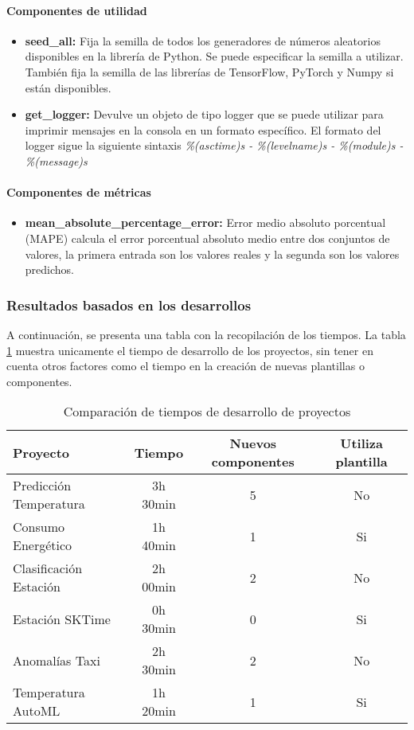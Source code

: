 \paragraph{Componentes de utilidad}
\begin{itemize}
    \item \textbf{seed\_all:} Fija la semilla de todos los generadores de números aleatorios
    disponibles en la librería de Python. Se puede especificar la semilla a utilizar. También
    fija la semilla de las librerías de TensorFlow, PyTorch y Numpy si están disponibles.
    \item \textbf{get\_logger:} Devulve un objeto de tipo logger que se puede utilizar para
    imprimir mensajes en la consola en un formato específico. El formato del logger sigue la
    siguiente sintaxis \textit{\%(asctime)s - \%(levelname)s - \%(module)s - \%(message)s} 
\end{itemize} 

\paragraph{Componentes de métricas}
\begin{itemize}
    \item \textbf{mean\_absolute\_percentage\_error:} Error medio absoluto porcentual (MAPE) 
    calcula el error porcentual absoluto medio entre dos conjuntos de valores, la primera 
    entrada son los valores reales y la segunda son los valores predichos.
\end{itemize}

\subsubsection{Resultados basados en los desarrollos}
A continuación, se presenta una tabla con la recopilación de los tiempos. La tabla \ref{tabla:result-time-scores} 
muestra unicamente el tiempo de desarrollo de los proyectos, sin tener en cuenta
otros factores como el tiempo en la creación de nuevas plantillas o componentes.

\begin{table}[h!]
    \centering
    \begin{tabular}{|l|c|c|c|}
    \hline
    \textbf{Proyecto} & \textbf{Tiempo} & \textbf{Nuevos componentes} & \textbf{Utiliza plantilla} \\
    \hline
    Predicción Temperatura & 3h 30min & 5 & No \\
    \hline
    Consumo Energético & 1h 40min & 1 & Si \\
    \hline
    Clasificación Estación & 2h 00min & 2 & No \\
    \hline
    Estación SKTime & 0h 30min & 0 & Si \\
    \hline
    Anomalías Taxi & 2h 30min& 2 & No \\
    \hline
    Temperatura AutoML & 1h 20min & 1 & Si \\
    \hline
    \end{tabular}
    \caption{Comparación de tiempos de desarrollo de proyectos}
    \label{tabla:result-time-scores}
\end{table}

